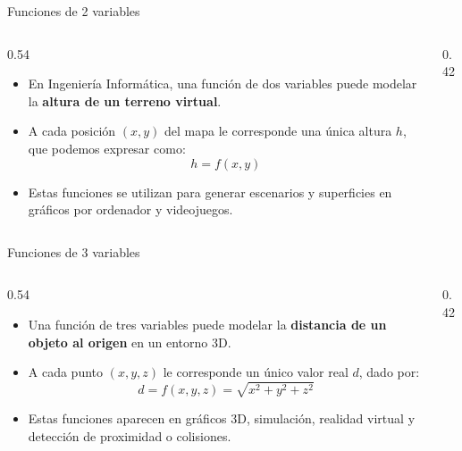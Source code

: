 \documentclass[main.tex]{subfiles}
\begin{document}
\begin{frame}{Funciones de 2 variables}
  \begin{columns}[c,onlytextwidth]
    \begin{column}{0.54\textwidth}
      \begin{itemize}
        \item En Ingeniería Informática, una función de dos variables puede
              modelar la \textbf{altura de un terreno virtual}.

        \item A cada posición $(x,y)$ del mapa le corresponde una
              única altura $h$, que podemos expresar como:
              \[
                h=f(x,y)
              \]

        \item Estas funciones se utilizan para generar escenarios y
              superficies en gráficos por ordenador y videojuegos.
      \end{itemize}
    \end{column}
    \begin{column}{0.42\textwidth}
      \centering
    \end{column}
  \end{columns}
\end{frame}

\begin{frame}{Funciones de 3 variables}
  \begin{columns}[c,onlytextwidth]
    \begin{column}{0.54\textwidth}
      \begin{itemize}
        \item Una función de tres variables puede modelar la
              \textbf{distancia de un objeto al origen} en un entorno 3D.

        \item A cada punto $(x,y,z)$ le corresponde un único
              valor real $d$, dado por:
              \[
                d=f(x,y,z)=\sqrt{x^2+y^2+z^2}
              \]

        \item Estas funciones aparecen en gráficos 3D, simulación,
              realidad virtual y detección de proximidad o colisiones.
      \end{itemize}
    \end{column}
    \begin{column}{0.42\textwidth}
      \centering
    \end{column}
  \end{columns}
\end{frame}
\end{document}
